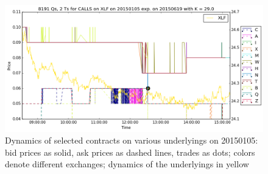 \documentclass[a4paper,12pt]{article}
\theoremstyle{plain}
\theoremstyle{definition}
\begin{document}
\begin{figure}[H]
\begin{center}
 \endminipage
 \hspace{3mm}
 \includegraphics[width=\linewidth]{figures/contract_pics/XLF_middle.png}
 \endminipage
\end{center}
\vspace{-3mm}
\caption{\footnotesize Dynamics of selected contracts on various underlyings on 20150105: bid prices as solid, ask prices as dashed lines, trades as dots; colors denote different exchanges; dynamics of the underlyings in yellow} 
\label{cntrt_pics_4}
\end{figure}
\vspace*{\fill}

\newpage
\end{document}
